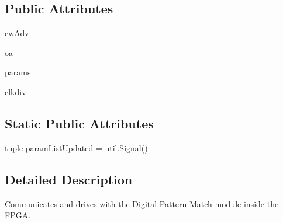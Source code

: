 \subsection*{Public Attributes}
\begin{DoxyCompactItemize}
\item 
\hyperlink{classsoftware_1_1chipwhisperer_1_1capture_1_1scopes_1_1cwhardware_1_1ChipWhispererDigitalPattern_1_1ChipWhispererDigitalPattern_ae399643cf5365a34f1996246b84c0bbc}{cw\+Adv}
\item 
\hyperlink{classsoftware_1_1chipwhisperer_1_1capture_1_1scopes_1_1cwhardware_1_1ChipWhispererDigitalPattern_1_1ChipWhispererDigitalPattern_a56e9484cfa73593623eed4bb50635cee}{oa}
\item 
\hyperlink{classsoftware_1_1chipwhisperer_1_1capture_1_1scopes_1_1cwhardware_1_1ChipWhispererDigitalPattern_1_1ChipWhispererDigitalPattern_a86a4d66129c4a7117a3542b71b2fe004}{params}
\item 
\hyperlink{classsoftware_1_1chipwhisperer_1_1capture_1_1scopes_1_1cwhardware_1_1ChipWhispererDigitalPattern_1_1ChipWhispererDigitalPattern_a92f823025adf5ee751a3219dc9104350}{clkdiv}
\end{DoxyCompactItemize}
\subsection*{Static Public Attributes}
\begin{DoxyCompactItemize}
\item 
tuple \hyperlink{classsoftware_1_1chipwhisperer_1_1capture_1_1scopes_1_1cwhardware_1_1ChipWhispererDigitalPattern_1_1ChipWhispererDigitalPattern_a5b896f5498ebe6624fe774289c201ccf}{param\+List\+Updated} = util.\+Signal()
\end{DoxyCompactItemize}


\subsection{Detailed Description}
\begin{DoxyVerb}Communicates and drives with the Digital Pattern Match module inside the FPGA. 
\end{DoxyVerb}
 

